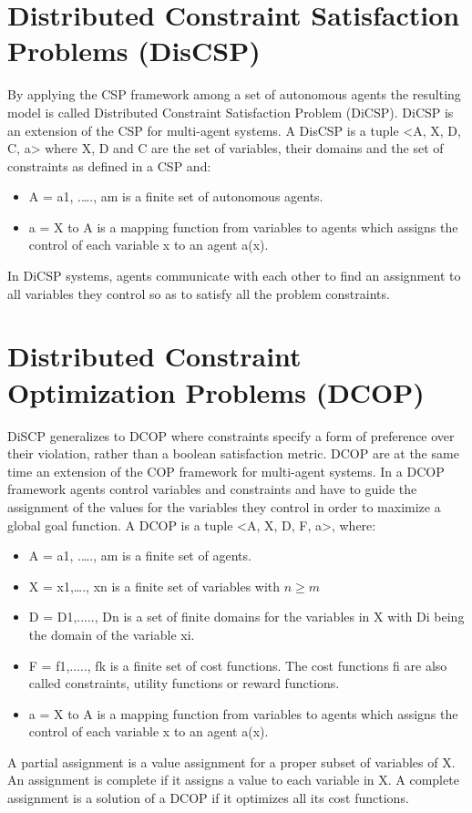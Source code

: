 \documentclass[11pt,a4paper,onecolumn]{article}
\begin{document}
	\section{Distributed Constraint Satisfaction Problems (DisCSP)}
	By applying the CSP framework among a set of autonomous agents the resulting model is called Distributed Constraint Satisfaction Problem (DiCSP). DiCSP is an extension of the CSP for multi-agent systems. A DisCSP is a tuple <A, X, D, C, a> where X, D and C are the set of variables, their domains and the set of constraints as defined in a CSP and:
	
		\begin{itemize}
			\item A = {a1, .…., am} is a finite set of autonomous agents.
			\item a =  X to A is a mapping function from variables to agents which assigns the control of each variable x to an agent a(x).
		\end{itemize}
	
	In DiCSP systems, agents communicate with each other to find an assignment to all variables they control so as to satisfy all the problem constraints.
	
	\section{Distributed Constraint Optimization Problems (DCOP)}
	DiSCP generalizes to DCOP where constraints specify a form of preference over their violation, rather than a boolean satisfaction metric. DCOP are at the same time an extension of the COP framework for multi-agent systems. In a DCOP framework agents control variables and constraints and have to guide the assignment of the values for the variables they control in order to maximize a global goal function. A DCOP is a tuple <A, X, D, F, a>, where:
	\begin{itemize}
		\item A = {a1, .…., am} is a finite set of agents.
		\item X = {x1,…., xn} is a finite set of variables with $n\ge m$
		\item D = {D1,....., Dn} is a set of finite domains for the variables in X with Di being the domain of the variable xi.
		\item F = {f1,....., fk} is a finite set of cost functions. The cost functions fi are also called constraints, utility functions or reward functions.
		\item a =  X to A is a mapping function from variables to agents which assigns the control of each variable x to an agent a(x).
	\end{itemize}
	A partial assignment is a value assignment for a proper subset of variables of X. An assignment is complete if it assigns a value to each variable in X. A complete assignment is a solution of a DCOP if it optimizes all its cost functions.
\end{document}
